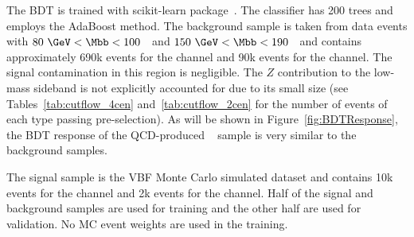 The BDT is trained with scikit-learn package~\cite{scikit-learn}. The classifier has 200 trees and employs the AdaBoost method. The background sample is taken from data events with $80~\GeV < \Mbb <100$~\GeV~and $150~\GeV<\Mbb<190$~\GeV~and contains approximately 690k events for the \fourcentral channel and 90k events for the \twocentral channel. The signal contamination in this region is negligible.  The $Z$ contribution to the low-mass sideband is not explicitly accounted for due to its small size (see Tables~\ref{tab:cutflow_4cen} and~\ref{tab:cutflow_2cen} for the number of events of each type passing pre-selection).  As will be shown in Figure~\ref{fig:BDTResponse},  the BDT response of the QCD-produced \zjets~ sample is very similar to the background samples. 

The signal sample is the VBF Monte Carlo simulated dataset and contains 10k events for the \fourcentral channel and 2k events for the \twocentral channel.  Half of the signal and background samples are used for training and the other half are used for validation.  No MC event weights are used in the training.  

